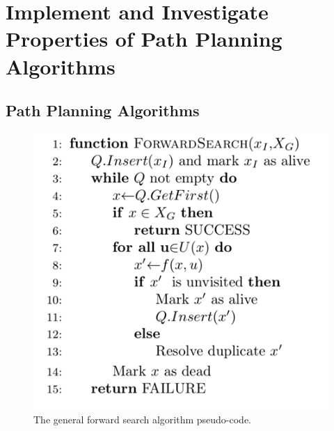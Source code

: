 \documentclass[a4paper,12pt]{article}
\begin{document}
	\pagebreak
	
	\tableofcontents
	
	\pagebreak
	
	\section{Implement and Investigate Properties of Path Planning Algorithms}
		
		\subsection{Path Planning Algorithms}
				
			\begin{figure}[H]
				\renewcommand\thefigure{1.1}
				\centering
				
				\includegraphics[scale=0.6]{images/general_forward_search_pseudocode.png}
				\caption{The general forward search algorithm pseudo-code. }
			\end{figure}
			
\end{document}
